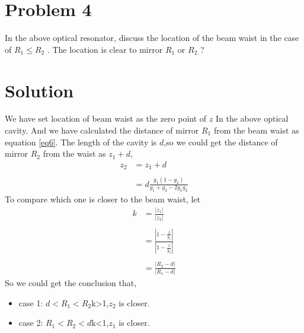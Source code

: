 \documentclass{article}
\begin{document}
\section{Problem 4}
In the above optical resonator, discuss the location of the beam waist in the case of $R_1 \leq R_2$ . The location is clear to mirror $ R_1 $ or $ R_2 $ ?
\section*{Solution}
We have set location of beam waist as the zero point of $z$ In the above optical cavity. And we have calculated the distance of mirror $R_1$ from the beam waist as equation  \ref{eq6}. The length of the cavity is $d$,so we could get the distance of mirror $R_2$ from the waist as $z_1+d$,
\begin{equation}\label{eq8}
	\begin{aligned}
	z_2&=z_1+d\\
	\\
	&=d\frac{g_1(1-g_2)}{g_1+g_2-2g_1g_2}
	\end{aligned}
\end{equation}
To compare which one is closer to the beam waist, let
\begin{equation}\label{key}
	\begin{aligned}
	k&=\frac{|z_1|}{|z_2|}\\
	\\
	&=\frac{|1-\frac{1}{g_1}|}{|1-\frac{1}{g_2}|}\\
	\\
	&=\frac{|R_2-d|}{|R_1-d|}
	\end{aligned}	
\end{equation}
So we could get the conclusion that,
\begin{itemize}
	\item case 1: $d<R_1<R_2$\quad k>1,\quad $z_2$ is closer.
	\item case 2: $R_1<R_2<d$\quad k<1,\quad $z_1$ is closer.
\end{itemize}
\end{document}
